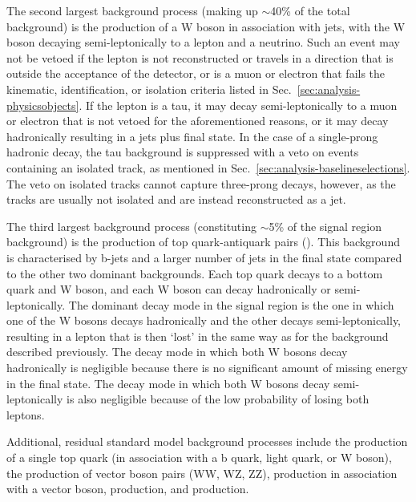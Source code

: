 The second largest background process (making up $\sim$40\% of the total 
background) is the production of a W boson in 
association with jets, with the W boson decaying semi-leptonically to a lepton 
and a neutrino. Such an event may not be vetoed if the lepton is not 
reconstructed or travels in a direction that is outside the acceptance of the 
detector, or is a muon or electron that fails the kinematic, identification, or 
isolation criteria listed in Sec.~\ref{sec:analysis-physicsobjects}. If the 
lepton 
is a tau, it may decay semi-leptonically to a muon or electron that is not 
vetoed for the aforementioned reasons, or it may decay hadronically resulting 
in a jets plus \met final state. In the case of a single-prong hadronic decay, 
the 
tau background is suppressed with a veto on events containing an isolated 
track, as mentioned in Sec.~\ref{sec:analysis-baselineselections}. The veto on 
isolated tracks cannot 
capture three-prong decays, however, as the tracks are usually not isolated and 
are instead reconstructed as a jet.

The third largest background process (constituting $\sim$5\% of the signal 
region background) is the production of top quark-antiquark pairs 
(\ttj). This background is characterised by b-jets and a larger number 
of jets in the final state compared to the other two dominant backgrounds.  
Each top quark decays to a bottom quark and W boson, and each W boson can decay 
hadronically or semi-leptonically. The dominant decay mode in the signal region 
is the one in which one of the W bosons decays hadronically and the other 
decays semi-leptonically, resulting in a lepton that is then `lost' in the same 
way as for the \wlj background described previously. The decay mode in which 
both W bosons decay hadronically is negligible because there is no significant 
amount of missing energy in the final state. The decay mode in which both W 
bosons decay semi-leptonically is also negligible because of the low 
probability of losing both leptons.

Additional, residual standard model background processes include the production 
of a single top quark (in association with a b quark, light quark, or W boson), 
the production of vector boson pairs (WW, WZ, ZZ), \ttbar production in 
association with a vector boson, \zllj production, and \gj production.

